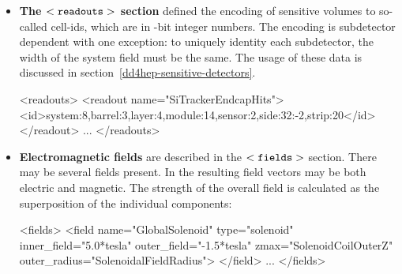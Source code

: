 \documentclass[10pt,a4paper]{article}
\begin{document}
\begin{itemize}
\item {\bf{The $\tt<readouts>$ section}} defined the encoding of sensitive volumes
    to so-called cell-ids, which are in -bit integer numbers. The encoding
    is subdetector dependent with one exception: to uniquely identity each subdetector,
    the width of the system field must be the same. The usage of these data is 
    discussed in section~\ref{dd4hep-sensitive-detectors}.
\begin{code}
<readouts>
  <readout name="SiTrackerEndcapHits">
    <id>system:8,barrel:3,layer:4,module:14,sensor:2,side:32:-2,strip:20</id>
  </readout>
  ...
</readouts>
\end{code}

\item {\bf{Electromagnetic fields}} are described in the $\tt<fields>$ section.
    There may be several fields present. In \DDhep the resulting field vectors
    may be both electric and magnetic. The strength of the overall field is calculated
    as the superposition of the individual components:
\begin{code}
<fields>
  <field name="GlobalSolenoid" type="solenoid" 
         inner_field="5.0*tesla"
         outer_field="-1.5*tesla" 
         zmax="SolenoidCoilOuterZ"
         outer_radius="SolenoidalFieldRadius">
  </field>
  ...
</fields>
\end{code}
\end{itemize}



\newpage
\end{document}
